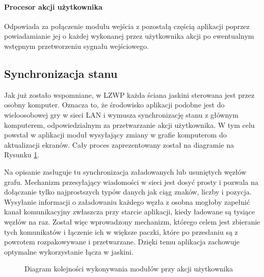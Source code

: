 \paragraph{Procesor akcji użytkownika}
Odpowiada za połączenie modułu wejścia z pozostałą częścią aplikacji poprzez powiadamianie jej o każdej wykonanej przez użytkownika akcji po ewentualnym wstępnym przetworzeniu sygnału wejściowego.



\subsection{Synchronizacja stanu}
Jak już zostało wspomniane, w LZWP każda ściana jaskini sterowana jest przez osobny komputer. Oznacza to, że środowisko aplikacji podobne jest do wieloosobowej gry w sieci LAN i wymusza synchronizację stanu z głównym komputerem, odpowiedzialnym za przetwarzanie akcji użytkownika. W tym celu powstał w aplikacji moduł wysyłający zmiany w grafie komputerom do aktualizacji ekranów. Cały proces zaprezentowany został na diagramie na Rysunku \ref{fig:diagram-modolow}.

Na opisanie zasługuje tu synchronizacja załadowanych lub usuniętych węzłów grafu. Mechanizm przesyłający wiadomości w sieci jest dosyć prosty i pozwala na dołączanie tylko najprostszych typów danych jak ciąg znaków, liczby i pozycja. Wysyłanie informacji o załadowaniu każdego węzła z osobna mogłoby zapełnić kanał komunikacyjny zwłaszcza przy starcie aplikacji, kiedy ładowane są tysiące węzłów na raz. Został więc wprowadzony mechanizm, którego celem jest zbieranie tych komunikatów i łączenie ich w większe paczki, które po przesłaniu są z powrotem rozpakowywane i przetwarzane. Dzięki temu aplikacja zachowuje optymalne wykorzystanie łącza w jaskini.

\begin{figure}[H]
\begin{center}
\end{center}
\caption{Diagram kolejności wykonywania modułów przy akcji użytkownika}
\label{fig:diagram-modolow}
\end{figure}



